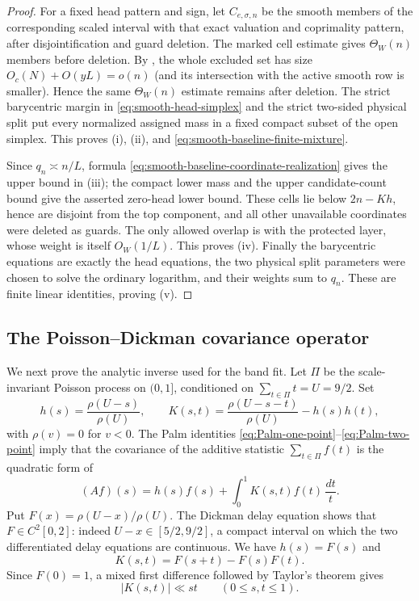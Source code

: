 \documentclass[11pt]{article}
\numberwithin{equation}{section}
\theoremstyle{definition}
\theoremstyle{remark}
\newcommand{\1}{\mathbf 1}
\begin{document}
\begin{proof}
For a fixed head pattern and sign, let \(C_{e,\sigma,n}\) be the smooth
members of the corresponding scaled interval with that exact valuation
and coprimality pattern, after disjointification and guard deletion.
The marked cell estimate gives \(\Theta_W(n)\) members before deletion.
By , the whole excluded set has size
\(O_c(N)+O(yL)=o(n)\) (and its intersection with the active smooth row
is smaller).  Hence the same \(\Theta_W(n)\) estimate remains after
deletion.  The strict barycentric margin in
\eqref{eq:smooth-head-simplex} and the strict two-sided physical split
put every normalized assigned mass in a fixed compact subset of the open
simplex.  This proves (i), (ii), and
\eqref{eq:smooth-baseline-finite-mixture}.

Since \(q_n\asymp n/L\), formula
\eqref{eq:smooth-baseline-coordinate-realization} gives the upper bound
in (iii); the compact lower mass and the upper candidate-count bound give
the asserted zero-head lower bound.  These cells lie below
\(2n-Kh\), hence are disjoint from the top component, and all other
unavailable coordinates were deleted as guards.  The only allowed
overlap is with the protected layer, whose weight is itself \(O_W(1/L)\).
This proves (iv).  Finally the barycentric equations are exactly the
head equations, the two physical split parameters were chosen to solve
the ordinary logarithm, and their weights sum to \(q_n\).  These are
finite linear identities, proving (v).
\end{proof}

\subsection{The Poisson--Dickman covariance operator}
\label{subsec:smooth-PD-operator}

We next prove the analytic inverse used for the band fit.  Let \(\Pi\)
be the scale-invariant Poisson process on \((0,1]\), conditioned on
\(\sum_{t\in\Pi}t=U=9/2\).  Set
\[
 h(s)=\frac{\rho(U-s)}{\rho(U)},\qquad
 K(s,t)=\frac{\rho(U-s-t)}{\rho(U)}-h(s)h(t),
\]
with \(\rho(v)=0\) for \(v<0\).  The Palm identities
\eqref{eq:Palm-one-point}--\eqref{eq:Palm-two-point} imply that the
covariance of the additive statistic \(\sum_{t\in\Pi}f(t)\) is the
quadratic form of
\begin{equation}
 (Af)(s)=h(s)f(s)+\int_0^1K(s,t)f(t)\,\frac{dt}{t}.
\label{eq:smooth-PD-operator}
\end{equation}
Put \(F(x)=\rho(U-x)/\rho(U)\).  The Dickman delay equation shows that
\(F\in C^2[0,2]\): indeed \(U-x\in[5/2,9/2]\), a compact interval on
which the two differentiated delay equations are continuous.  We have
\(h(s)=F(s)\) and
\[
 K(s,t)=F(s+t)-F(s)F(t).
\]
Since \(F(0)=1\), a mixed first difference followed by Taylor's theorem
gives
\begin{equation}
                         |K(s,t)|\ll st
       \qquad(0\leq s,t\leq1).
\label{eq:smooth-kernel-product}
\end{equation}
\end{document}
